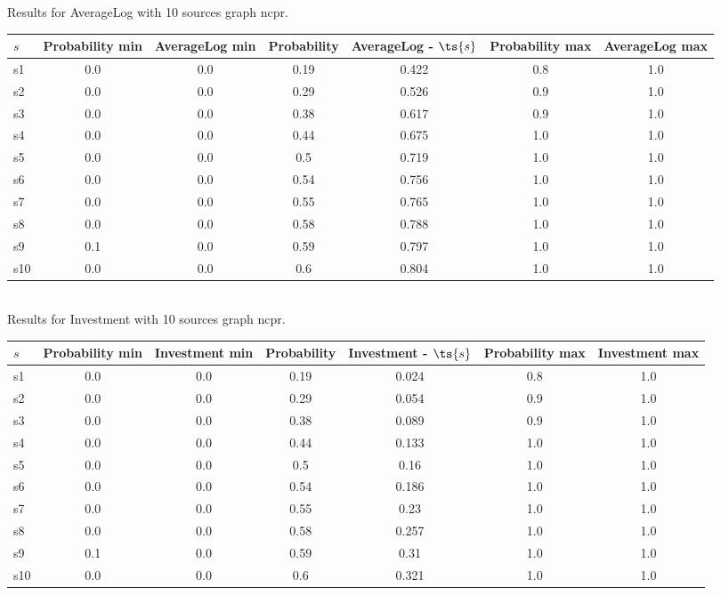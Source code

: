 \documentclass{article}
\begin{document}
\noindent Results for AverageLog with 10 sources graph ncpr.

\noindent\begin{tabular}{|l|c|c|c|c|c|c|}
\hline
$s$& Probability min & AverageLog min & Probability & AverageLog - $\ts{s}$ & Probability max & AverageLog max\\
\hline
s1 &0.0 & 0.0 & 0.19 & 0.422 & 0.8 & 1.0\\
\hline
s2 &0.0 & 0.0 & 0.29 & 0.526 & 0.9 & 1.0\\
\hline
s3 &0.0 & 0.0 & 0.38 & 0.617 & 0.9 & 1.0\\
\hline
s4 &0.0 & 0.0 & 0.44 & 0.675 & 1.0 & 1.0\\
\hline
s5 &0.0 & 0.0 & 0.5 & 0.719 & 1.0 & 1.0\\
\hline
s6 &0.0 & 0.0 & 0.54 & 0.756 & 1.0 & 1.0\\
\hline
s7 &0.0 & 0.0 & 0.55 & 0.765 & 1.0 & 1.0\\
\hline
s8 &0.0 & 0.0 & 0.58 & 0.788 & 1.0 & 1.0\\
\hline
s9 &0.1 & 0.0 & 0.59 & 0.797 & 1.0 & 1.0\\
\hline
s10 &0.0 & 0.0 & 0.6 & 0.804 & 1.0 & 1.0\\
\hline
\end{tabular}\\

\noindent Results for Investment with 10 sources graph ncpr.

\noindent\begin{tabular}{|l|c|c|c|c|c|c|}
\hline
$s$& Probability min & Investment min & Probability & Investment - $\ts{s}$ & Probability max & Investment max\\
\hline
s1 &0.0 & 0.0 & 0.19 & 0.024 & 0.8 & 1.0\\
\hline
s2 &0.0 & 0.0 & 0.29 & 0.054 & 0.9 & 1.0\\
\hline
s3 &0.0 & 0.0 & 0.38 & 0.089 & 0.9 & 1.0\\
\hline
s4 &0.0 & 0.0 & 0.44 & 0.133 & 1.0 & 1.0\\
\hline
s5 &0.0 & 0.0 & 0.5 & 0.16 & 1.0 & 1.0\\
\hline
s6 &0.0 & 0.0 & 0.54 & 0.186 & 1.0 & 1.0\\
\hline
s7 &0.0 & 0.0 & 0.55 & 0.23 & 1.0 & 1.0\\
\hline
s8 &0.0 & 0.0 & 0.58 & 0.257 & 1.0 & 1.0\\
\hline
s9 &0.1 & 0.0 & 0.59 & 0.31 & 1.0 & 1.0\\
\hline
s10 &0.0 & 0.0 & 0.6 & 0.321 & 1.0 & 1.0\\
\hline
\end{tabular}\\
\end{document}
